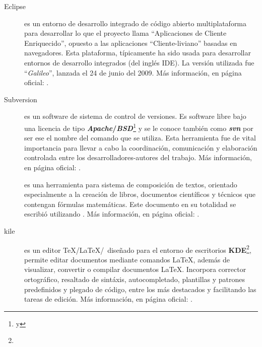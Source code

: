 \begin{description}
\item [Eclipse] es un entorno de desarrollo integrado de código abierto multiplataforma para desarrollar lo que el proyecto llama ``Aplicaciones de Cliente Enriquecido'', opuesto a las aplicaciones ``Cliente-liviano'' basadas en nave\-gadores. Esta plataforma, típicamente ha sido usada para desarrollar entornos de desarrollo integrados (del inglés IDE). La versión utilizada fue ``\textit{Galileo}'', lanzada el 24 de junio del 2009. Más información, en página oficial: .

\item [Subversion] es un software de sistema de control de versiones. Es software libre bajo una licencia de tipo \textbf{\textit{Apache}/\textit{BSD}}\footnote{ y } y se le conoce también como \textit{\textbf{svn}} por ser ese el nombre del comando que se utiliza. Esta herramienta fue de vital importancia para llevar a cabo la coordinación, comunicación y elaboración controlada entre los desarrolladores-autores del trabajo. Más información, en página oficial: .

\item [\LaTeXe] es una herramienta para sistema de composición de textos, orientado especialmente a la creación de libros, documentos científicos y técnicos que contengan fórmulas matemáticas. Este documento en su totalidad se escribió utilizando \LaTeXe\cite{latex}. Más información, en página oficial: .

\item [kile] es un editor \TeX/\LaTeX/\LaTeXe\ diseñado para el entorno de escritorios \textbf{KDE}\footnote{}, permite editar documentos mediante comandos \LaTeX, además de visualizar, convertir o compilar documentos \LaTeX. Incorpora corrector ortográfico, resaltado de sintáxis, autocompletado, plantillas y patrones predefinidos y plegado de código, entre los más destacados y facilitando las tareas de edición. Más información, en página oficial: .


\end{description}
